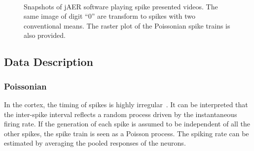 \begin{figure}[hbt]
  \centering
  \\
  
  \caption{Snapshots of jAER software playing spike presented videos. The same image of digit ``0'' are transform to spikes with two conventional means. The raster plot of the Poissonian spike trains is also provided.}
  \label{fig:zero}
\end{figure}

\subsection{Data Description}	
	\subsubsection{Poissonian}
	
	In the cortex, the timing of spikes is highly irregular~\citep{squire1998findings}.
	It can be interpreted that the inter-spike interval reflects a random process driven by the instantaneous firing rate.
	If the generation of each spike is assumed to be independent of all the other spikes, the spike train is seen as a Poisson process.
	The spiking rate can be estimated by averaging the pooled responses of the neurons.
		
